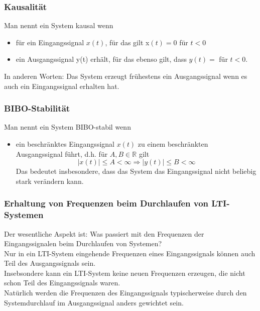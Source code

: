 \documentclass[12pt,a4paper]{scrartcl}
\begin{document}
    \subsubsection{Kausalität}
    \label{sec:sub:sub:kausalitaet}
    Man nennt ein System kausal wenn 
    \begin{itemize}
      \item für ein Eingangssignal $x(t)$, für das gilt x$(t) = 0$ für $t<0$ 
      \item ein Ausgangssignal y(t) erhält, für das ebenso gilt, dass $y(t) = $ für $ t<0$. 
    \end{itemize}
    \noindent    In anderen Worten: Das System erzeugt frühestens ein Ausgangssignal wenn es auch ein Eingangssignal erhalten hat. \\

    \subsubsection{BIBO-Stabilität}
    \label{sec:sub:sub:bibo-stabilitaet}
    Man nennt ein System BIBO-stabil wenn 
    \begin{itemize}
      \item ein beschränktes Eingangssignal $x(t)$ zu einem beschränkten Ausgangssignal führt, d.h. für $A, B \in \mathbb{R}$ gilt 
          $$|x(t)| \leq A < \infty \Rightarrow |y(t)| \leq B < \infty$$
          Das bedeutet insbesondere, dass das System das Eingangssignal nicht beliebig stark verändern kann.
    \end{itemize}

    \subsubsection{Erhaltung von Frequenzen beim Durchlaufen von LTI-Systemen}
    \label{sec:sub:sub:erhalt-der-frequenzen}
    \noindent Der wesentliche Aspekt ist: Was passiert mit den Frequenzen der Eingangssignalen beim Durchlaufen von Systemen? \\ 

    \noindent Nur in ein LTI-System eingehende Frequenzen eines Eingangssignals können auch Teil des Ausgangssignals sein. \\
    Insebsondere kann ein LTI-System keine neuen Frequenzen erzeugen, die nicht schon Teil des Eingangssignals waren.\\

    \noindent Natürlich werden die Frequenzen des Eingangssignals typischerweise durch den Systemdurchlauf im Ausgangssignal anders gewichtet sein. \\
\end{document}
